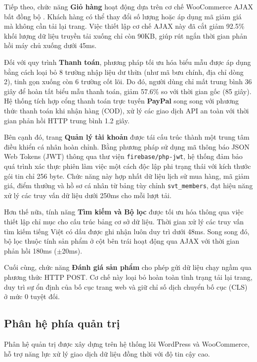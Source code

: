 Tiếp theo, chức năng \textbf{Giỏ hàng} hoạt động dựa trên cơ chế WooCommerce AJAX bất đồng bộ \cite{garrett2005ajax}. Khách hàng có thể thay đổi số lượng hoặc áp dụng mã giảm giá mà không cần tải lại trang. Việc thiết lập cơ chế AJAX này đã cắt giảm 92.5\% khối lượng dữ liệu truyền tải xuống chỉ còn 90KB, giúp rút ngắn thời gian phản hồi máy chủ xuống dưới 45ms.

Đối với quy trình \textbf{Thanh toán}, phương pháp tối ưu hóa biểu mẫu được áp dụng bằng cách loại bỏ 8 trường nhập liệu dư thừa (như mã bưu chính, địa chỉ dòng 2), tinh gọn xuống còn 6 trường cốt lõi. Do đó, người dùng chỉ mất trung bình 36 giây để hoàn tất biểu mẫu thanh toán, giảm 57.6\% so với thời gian gốc (85 giây). Hệ thống tích hợp cổng thanh toán trực tuyến \textbf{PayPal} \cite{plugin_paypal} song song với phương thức thanh toán khi nhận hàng (COD), xử lý các giao dịch API an toàn với thời gian phản hồi HTTP trung bình 1.2 giây.

Bên cạnh đó, trang \textbf{Quản lý tài khoản} được tái cấu trúc thành một trung tâm điều khiển cá nhân hoàn chỉnh. Bằng phương pháp sử dụng mã thông báo JSON Web Tokens (JWT) \cite{rfc7519} thông qua thư viện \texttt{firebase/php-jwt}, hệ thống đảm bảo quá trình xác thực phiên làm việc một cách độc lập phi trạng thái với kích thước gói tin chỉ 256 byte. Chức năng này hợp nhất dữ liệu lịch sử mua hàng, mã giảm giá, điểm thưởng và hồ sơ cá nhân từ bảng tùy chỉnh \texttt{svt\_members}, đạt hiệu năng xử lý các truy vấn dữ liệu dưới 250ms cho mỗi lượt tải.

Hơn thế nữa, tính năng \textbf{Tìm kiếm và Bộ lọc} được tối ưu hóa thông qua việc thiết lập chỉ mục cho cấu trúc bảng cơ sở dữ liệu. Thời gian xử lý các truy vấn tìm kiếm tiếng Việt có dấu được ghi nhận luôn duy trì dưới 48ms. Song song đó, bộ lọc thuộc tính sản phẩm ở cột bên trái hoạt động qua AJAX với thời gian phản hồi 180ms ($\pm$20ms).

Cuối cùng, chức năng \textbf{Đánh giá sản phẩm} cho phép gửi dữ liệu chạy ngầm qua phương thức HTTP POST. Cơ chế này loại bỏ hoàn toàn tình trạng tải lại trang, duy trì sự ổn định của bố cục trang web và giữ chỉ số dịch chuyển bố cục (CLS) ở mức 0 tuyệt đối.

\subsection{Phân hệ phía quản trị}

Phân hệ quản trị được xây dựng trên hệ thống lõi WordPress và WooCommerce, hỗ trợ năng lực xử lý giao dịch dữ liệu đồng thời với độ tin cậy cao.

